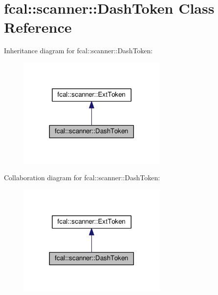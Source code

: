 \hypertarget{classfcal_1_1scanner_1_1DashToken}{}\section{fcal\+:\+:scanner\+:\+:Dash\+Token Class Reference}
\label{classfcal_1_1scanner_1_1DashToken}


Inheritance diagram for fcal\+:\+:scanner\+:\+:Dash\+Token\+:
\nopagebreak
\begin{figure}[H]
\begin{center}
\leavevmode
\includegraphics[width=209pt]{classfcal_1_1scanner_1_1DashToken__inherit__graph}
\end{center}
\end{figure}


Collaboration diagram for fcal\+:\+:scanner\+:\+:Dash\+Token\+:
\nopagebreak
\begin{figure}[H]
\begin{center}
\leavevmode
\includegraphics[width=209pt]{classfcal_1_1scanner_1_1DashToken__coll__graph}
\end{center}
\end{figure}
